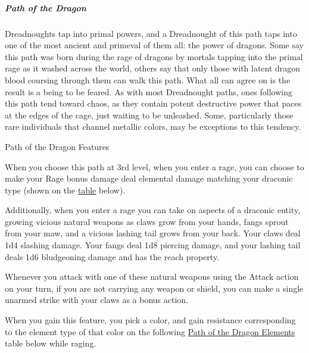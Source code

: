 \subparagraph{Path of the Dragon}\label{dreadnought-subclasse-dragon}

Dreadnoughts tap into primal powers, and a Dreadnought of this path taps
into one of the most ancient and primeval of them all: the power of
dragons. Some say this path was born during the rage of dragons by
mortals tapping into the primal rage as it washed across the world,
others say that only those with latent dragon blood coursing through
them can walk this path. What all can agree on is the result is a being
to be feared. As with most Dreadnought paths, ones following this path
tend toward chaos, as they contain potent destructive power that paces
at the edges of the cage, just waiting to be unleashed. Some,
particularly those rare individuals that channel metallic colors, may be
exceptions to this tendency.

Path of the Dragon Features

When you choose this path at 3rd level, when you enter a rage, you can
choose to make your Rage bonus damage deal elemental damage matching
your draconic type (shown on the
\hyperref[dreadnought-path-of-the-dragon-table]{table} below).

Additionally, when you enter a rage you can take on aspects of a
draconic entity, growing vicious natural weapons as claws grow from your
hands, fangs sprout from your maw, and a vicious lashing tail grows from
your back. Your claws deal 1d4 slashing damage. Your fangs deal 1d8
piercing damage, and your lashing tail deals 1d6 bludgeoning damage and
has the reach property.

Whenever you attack with one of these natural weapons using the Attack
action on your turn, if you are not carrying any weapon or shield, you
can make a single unarmed strike with your claws as a bonus action.

When you gain this feature, you pick a color, and gain resistance
corresponding to the element type of that color on the following
\hyperref[dreadnought-path-of-the-dragon-table]{Path of the Dragon
Elements} table below while raging.

